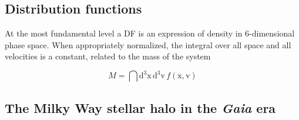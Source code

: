 \subsection{Distribution functions}

At the most fundamental level a DF is an expression of density in 6-dimensional phase space. When appropriately normalized, the integral over all space and all velocities is a constant, related to the mass of the system

\begin{equation}
    M = \dint \mathrm{d}^3\mathbf{\mathrm{x}}\, \mathrm{d}^3\mathbf{\mathrm{v}}\, f( \mathbf{\mathrm{x}}, \mathbf{\mathrm{v}} )
\end{equation}



\subsection{The Milky Way stellar halo in the \textit{Gaia} era}